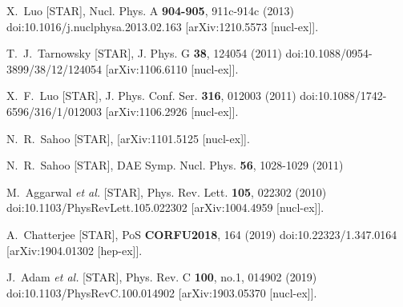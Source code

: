 \begin{thebibliography}{99}
X.~Luo [STAR],
Nucl. Phys. A \textbf{904-905}, 911c-914c (2013)
doi:10.1016/j.nuclphysa.2013.02.163
[arXiv:1210.5573 [nucl-ex]].

T.~J.~Tarnowsky [STAR],
J. Phys. G \textbf{38}, 124054 (2011)
doi:10.1088/0954-3899/38/12/124054
[arXiv:1106.6110 [nucl-ex]].

X.~F.~Luo [STAR],
J. Phys. Conf. Ser. \textbf{316}, 012003 (2011)
doi:10.1088/1742-6596/316/1/012003
[arXiv:1106.2926 [nucl-ex]].

N.~R.~Sahoo [STAR],
[arXiv:1101.5125 [nucl-ex]].

N.~R.~Sahoo [STAR],
DAE Symp. Nucl. Phys. \textbf{56}, 1028-1029 (2011)

M.~Aggarwal \textit{et al.} [STAR],
Phys. Rev. Lett. \textbf{105}, 022302 (2010)
doi:10.1103/PhysRevLett.105.022302
[arXiv:1004.4959 [nucl-ex]].

A.~Chatterjee [STAR],
PoS \textbf{CORFU2018}, 164 (2019)
doi:10.22323/1.347.0164
[arXiv:1904.01302 [hep-ex]].

J.~Adam \textit{et al.} [STAR],
Phys. Rev. C \textbf{100}, no.1, 014902 (2019)
doi:10.1103/PhysRevC.100.014902
[arXiv:1903.05370 [nucl-ex]].


\end{thebibliography}

